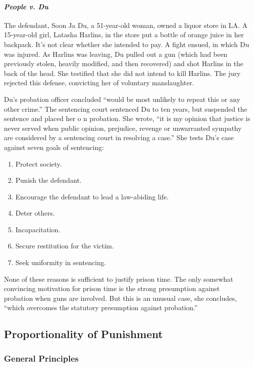 \paragraph{\emph{People v. Du}}

The defendant, Soon Ja Du, a 51-year-old woman, owned a liquor store in LA. A 15-year-old girl, Latasha Harlins, in the store put a bottle of orange juice in her backpack. It's not clear whether she intended to pay. A fight ensued, in which Du was injured. As Harlins was leaving, Du pulled out a gun (which had been previously stolen, heavily modified, and then recovered) and shot Harlins in the back of the head. She testified that she did not intend to kill Harlins. The jury rejected this defense, convicting her of voluntary manslaughter.

Du's probation officer concluded ``would be most unlikely to repeat this or any other crime.'' The sentencing court sentenced Du to ten years, but suspended the sentence and placed her o n probation. She wrote, ``it is my opinion that justice is never served when public opinion, prejudice, revenge or unwarranted sympathy are considered by a sentencing court in resolving a case.'' She tests Du's case against seven goals of sentencing:

\begin{enumerate}
    \item Protect society.
    \item Punish the defendant.
    \item Encourage the defendant to lead a law-abiding life.
    \item Deter others.
    \item Incapacitation.
    \item Secure restitution for the victim.
    \item Seek uniformity in sentencing.
\end{enumerate}

None of these reasons is sufficient to justify prison time. The only somewhat convincing motivation for prison time is the strong presumption against probation when guns are involved. But this is an unusual case, she concludes, ``which overcomes the statutory presumption against probation.''

\subsection{Proportionality of Punishment}

\subsubsection{General Principles}

